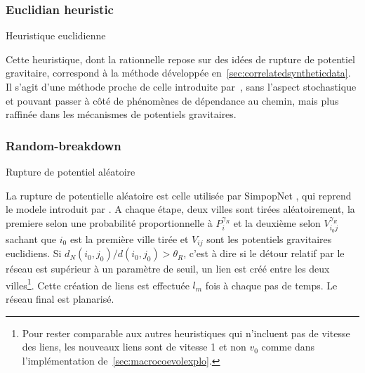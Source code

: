
\subsubsection{Euclidian heuristic}{Heuristique euclidienne}



Cette heuristique, dont la rationnelle repose sur des idées de rupture de potentiel gravitaire, correspond à la méthode développée en~\ref{sec:correlatedsyntheticdata}. Il s'agit d'une méthode proche de celle introduite par~\cite{schmitt2014modelisation}, sans l'aspect stochastique et pouvant passer à côté de phénomènes de dépendance au chemin, mais plus raffinée dans les mécanismes de potentiels gravitaires.



\subsubsection{Random-breakdown}{Rupture de potentiel aléatoire}

La rupture de potentielle aléatoire est celle utilisée par SimpopNet \cite{schmitt2014modelisation}, qui reprend le modele introduit par \cite{blumenfeld2010network}. A chaque étape, deux villes sont tirées aléatoirement, la premiere selon une probabilité proportionnelle à $P_i^{\gamma_R}$ et la deuxième selon $V_{i_0j}^{\gamma_R}$ sachant que $i_0$ est la première ville tirée et $V_{ij}$ sont les potentiels gravitaires euclidiens. Si $d_N(i_0,j_0) / d(i_0,j_0) > \theta_R$, c'est à dire si le détour relatif par le réseau est supérieur à un paramètre de seuil, un lien est créé entre les deux villes\footnote{Pour rester comparable aux autres heuristiques qui n'incluent pas de vitesse des liens, les nouveaux liens sont de vitesse 1 et non $v_0$ comme dans l'implémentation de~\ref{sec:macrocoevolexplo}.}. Cette création de liens est effectuée $l_m$ fois à chaque pas de temps. Le réseau final est planarisé.







